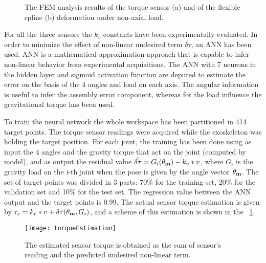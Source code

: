 %
\begin{figure}[]
	\centering
	\caption{The FEM analysis results of the torque sensor (a) and of the flexible spline (b) deformation under non-axial load.}
\end{figure}
%
%
For all the three sensors the $k_v$ constants have been experimentally evaluated. In order to minimize the effect of non-linear undesired term $\delta\tau$,  an ANN has been used. ANN is a mathematical approximation approach that is capable to infer non-linear behavior from experimental acquisitions. The ANN with 7 neurons in the hidden layer and sigmoid activation function are deputed to estimate the error on the basis of the 4 angles and load on each axis. The angular information is useful to infer the assembly error component, whereas for the load influence the gravitational torque has been used. 
\par To train the neural network the whole workspace has been partitioned in 414 target points. The torque sensor readings were acquired while the exoskeleton was holding the target position. For each joint, the training has been done using as input the 4 angles and the gravity torque that act on the joint (computed by model), and as output the residual value $\hat{\delta\tau} = G_i(\mathbf{\theta_m}) - k_v * v$, where $G_i$ is the gravity load on the i-th joint when the pose is given by the angle vector $\mathbf{\theta_m}$. The set of target points was divided in 3 parts: 70\% for the training set, 20\% for the validation set and 10\% for the test set. The regression value between the ANN output and the target points is 0.99.
The actual sensor torque estimation is given by $\bar{\tau}_s = k_v * v + \delta\tau(\mathbf{\theta_m},G_i)$, and a scheme of this estimation is shown in the \figurename \ \ref{fig:NN_schema}.
\begin{figure}[]
	\centering
	\texttt{[image: torqueEstimation]}	
	\caption{The estimated sensor torque is obtained as the sum of sensor's reading and the predicted undesired non-linear term.}
	\label{fig:NN_schema}
\end{figure}
